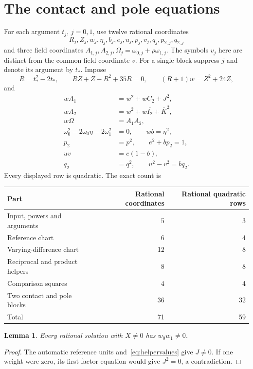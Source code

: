 \documentclass[11pt,a4paper]{article}
\newtheorem{lemma}[theorem]{Lemma}
\begin{document}
\section{The contact and pole equations}
For each argument $t_j$, $j=0,1$, use twelve rational coordinates
\[
 R_j,Z_j,w_j,\eta_j,b_j,e_j,u_j,p_j,v_j,q_j,p_{2,j},q_{2,j}
\]
and three field coordinates
$A_{1,j},A_{2,j},\Omega_j=\omega_{0,j}+\rho\omega_{1,j}$.
The symbols $v_j$ here are distinct from the common field coordinate $v$.
For a single block suppress $j$ and denote its argument by $t_*$.
Impose
\begin{equation}\label{eq:contactrows}
 R=t_*^2-2t_*,\qquad RZ+Z-R^2+35R=0,\qquad
                         (R+1)w=Z^2+24Z,
\end{equation}
and
\begin{align}
 wA_1&=w^2+wC_2+J^2,\label{eq:factor1}\\
 wA_2&=w^2+w\overline{I_2}+\overline K^2,\label{eq:factor2}\\
 w\Omega&=A_1A_2,\label{eq:product}\\
 \omega_0^2-2\omega_0\eta-2\omega_1^2&=0,
                    \qquad wb=\eta^2,\label{eq:tracepole}\\
 p_2&=p^2,\qquad e^2+bp_2=1,\label{eq:pole1}\\
 uv&=e(1-b),\label{eq:pole2}\\
 q_2&=q^2,\qquad u^2-v^2=bq_2.\label{eq:pole3}
\end{align}
Every displayed row is quadratic. The exact count is
\begin{center}
\begin{tabular}{lrr}
\toprule
Part & Rational coordinates & Rational quadratic rows\\
\midrule
Input, powers and arguments &5&3\\
Reference chart &6&4\\
Varying-difference chart &12&8\\
Reciprocal and product helpers &8&8\\
Comparison squares &4&4\\
Two contact and pole blocks &36&32\\
\midrule
Total &71&59\\
\bottomrule
\end{tabular}
\end{center}

\begin{lemma}\label{lem:nonzero}
Every rational solution with $X\ne0$ has $w_0w_1\ne0$.
\end{lemma}
\begin{proof}
The automatic reference units and~\eqref{eq:helpervalues} give $J\ne0$.
If one weight were zero, its first factor equation would give
$J^2=0$, a contradiction.
\end{proof}
\end{document}
